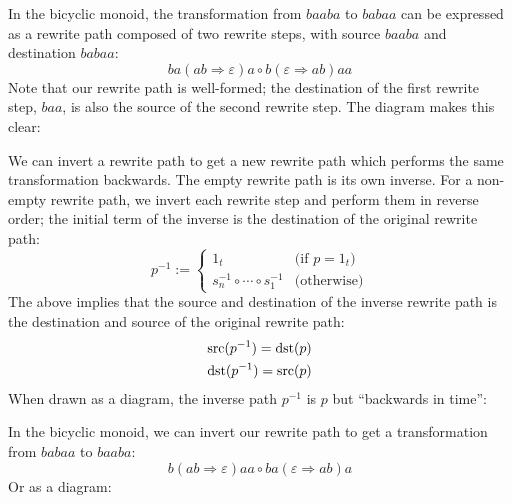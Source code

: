\documentclass[../generics]{subfiles}
\begin{document}
\begin{example}
In the bicyclic monoid, the transformation from $baaba$ to $babaa$ can be expressed as a rewrite path composed of two rewrite steps, with source $baaba$ and destination $babaa$:
\[ba(ab\Rightarrow\varepsilon)a\circ b(\varepsilon\Rightarrow ab)aa\]
Note that our rewrite path is well-formed; the destination of the first rewrite step, $baa$, is also the source of the second rewrite step. The diagram makes this clear:
\begin{quote}
\end{quote}
\end{example}
\begin{definition}
We can invert a rewrite path to get a new rewrite path which performs the same transformation backwards. The empty rewrite path is its own inverse. For a non-empty rewrite path, we invert each rewrite step and perform them in reverse order; the initial term of the inverse is the destination of the original rewrite path:
\[p^{-1}:=\begin{cases}
1_t&\text{(if $p=1_t$)}\\
s_n^{-1}\circ\cdots\circ s_1^{-1}&\text{(otherwise)}
\end{cases}
\]
The above implies that the source and destination of the inverse rewrite path is the destination and source of the original rewrite path:
\begin{gather*}
\operatorname{src}(p^{-1})=\operatorname{dst}(p)\\
\operatorname{dst}(p^{-1})=\operatorname{src}(p)
\end{gather*}
When drawn as a diagram, the inverse path $p^{-1}$ is $p$ but ``backwards in time'':
\begin{quote}
\end{quote}
\end{definition}
\begin{example}
In the bicyclic monoid, we can invert our rewrite path to get a transformation from $babaa$ to $baaba$:
\[b(ab\Rightarrow\varepsilon)aa\circ ba(\varepsilon\Rightarrow ab)a\]
Or as a diagram:
\begin{quote}
\end{quote}
\end{example}
\end{document}
